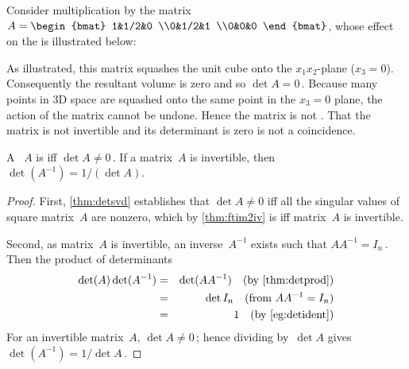\begin{example} \label{eg:detzerorow}
Consider multiplication by the matrix 
\(A=\begin{bmat} 1&1/2&0
\\0&1/2&1 \\0&0&0 \end{bmat}\),
whose effect on the  is illustrated below:
\begin{center}
\end{center}
As illustrated, this matrix squashes the unit cube onto the \(x_1x_2\)-plane (\(x_3=0\)).
Consequently the resultant volume is zero and so \(\det A=0\)\,.
Because many points in 3D space are squashed onto the same point in the \(x_3=0\) plane, the action of the matrix cannot be undone.  
Hence the matrix is not . 
That the matrix is not invertible and its determinant is zero is not a coincidence.
\end{example}


\begin{theorem} \label{thm:detinv} 
A ~\(A\) is  iff \(\det A\neq 0\)\,.
If a matrix~\(A\) is invertible, then \(\det(A^{-1})=1/(\det A)\).
\end{theorem}
\begin{proof} 
First, \cref{thm:detsvd} establishes that \(\det A\neq 0\) iff all the singular values of square matrix~\(A\) are nonzero, which by \cref{thm:ftim2iv} is iff matrix~\(A\) is invertible.

Second, as matrix~\(A\) is invertible, an inverse~\(A^{-1}\) exists such that \(AA^{-1}=I_n\)\,.
Then the product of determinants
\begin{eqnarray*}
\det(A)\det(A^{-1})
&=&\det(AA^{-1}) \quad(\text{by \cref{thm:detprod}})
\\&=&\det I_n\quad(\text{from }AA^{-1}=I_n)
\\&=&1\quad(\text{by \cref{eg:detident}})
\end{eqnarray*}
For an invertible matrix~\(A\), \(\det A\neq 0\)\,; hence
dividing by~\(\det A\) gives \(\det(A^{-1})=1/\det A\)\,.
\end{proof}






\sectionExercises



